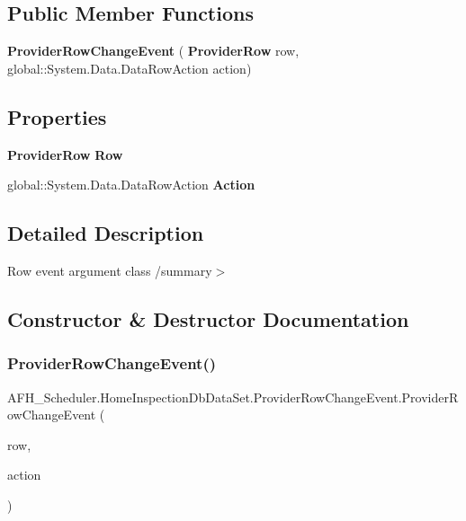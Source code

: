 \subsection*{Public Member Functions}
\begin{DoxyCompactItemize}
\item 
\textbf{ Provider\+Row\+Change\+Event} (\textbf{ Provider\+Row} row, global\+::\+System.\+Data.\+Data\+Row\+Action action)
\end{DoxyCompactItemize}
\subsection*{Properties}
\begin{DoxyCompactItemize}
\item 
\textbf{ Provider\+Row} \textbf{ Row}\hspace{0.3cm}{\ttfamily  [get]}
\item 
global\+::\+System.\+Data.\+Data\+Row\+Action \textbf{ Action}\hspace{0.3cm}{\ttfamily  [get]}
\end{DoxyCompactItemize}


\subsection{Detailed Description}
Row event argument class /summary$>$ 

\subsection{Constructor \& Destructor Documentation}
\mbox{\label{class_a_f_h___scheduler_1_1_home_inspection_db_data_set_1_1_provider_row_change_event_ae64def5540a4fc9e53bb4deeddfc931d}} 
\subsubsection{ProviderRowChangeEvent()}
{\footnotesize\ttfamily A\+F\+H\+\_\+\+Scheduler.\+Home\+Inspection\+Db\+Data\+Set.\+Provider\+Row\+Change\+Event.\+Provider\+Row\+Change\+Event (\begin{DoxyParamCaption}\item[{\textbf{ Provider\+Row}}]{row,  }\item[{global\+::\+System.\+Data.\+Data\+Row\+Action}]{action }\end{DoxyParamCaption})}



